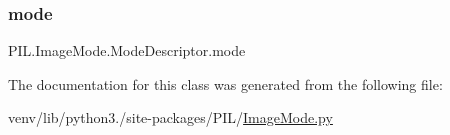 \subsubsection{\texorpdfstring{mode}{mode}}
{\footnotesize\ttfamily P\+I\+L.\+Image\+Mode.\+Mode\+Descriptor.\+mode}



The documentation for this class was generated from the following file\+:\begin{DoxyCompactItemize}
\item 
venv/lib/python3./site-\/packages/\+P\+I\+L/\hyperlink{ImageMode_8py}{Image\+Mode.\+py}\end{DoxyCompactItemize}
